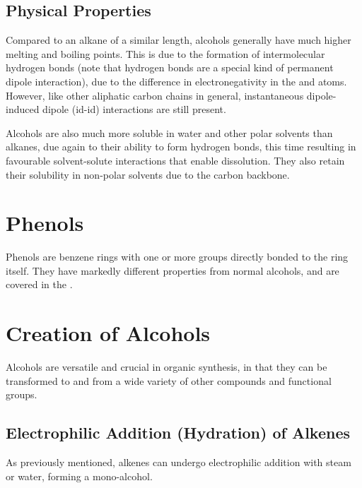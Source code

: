 		\subsection{Physical Properties}

			Compared to an alkane of a similar length, alcohols generally have much higher melting and boiling points. This is due to
			the formation of intermolecular hydrogen bonds (note that hydrogen bonds are a special kind of permanent dipole interaction),
			due to the difference in electronegativity in the  and  atoms. However, like other aliphatic carbon chains in
			general, instantaneous dipole-induced dipole (id-id) interactions are still present.

			Alcohols are also much more soluble in water and other polar solvents than alkanes, due again to their ability to form hydrogen
			bonds, this time resulting in favourable solvent-solute interactions that enable dissolution. They also retain their
			solubility in non-polar solvents due to the carbon backbone.


	\pagebreak
	\section{Phenols}

		Phenols are benzene rings with one or more  groups directly bonded to the ring itself. They have markedly different properties
		from normal alcohols, and are covered in the \hyperlink{Chapter_Phenols}{}.




	\section{Creation of Alcohols}

		Alcohols are versatile and crucial in organic synthesis, in that they can be transformed to and from a wide variety of other
		compounds and functional groups.

		\subsection{Electrophilic Addition (Hydration) of Alkenes}

			As previously mentioned, alkenes can undergo electrophilic addition with steam or water, forming a mono-alcohol.


